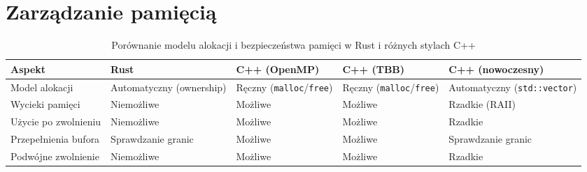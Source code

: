 \section{Zarządzanie pamięcią}
\begin{table}[H]
    \centering
    \caption{Porównanie modelu alokacji i bezpieczeństwa pamięci w Rust i różnych stylach C++}
    \begin{tabularx}{\textwidth}{lXXXX}
    \toprule
    \textbf{Aspekt} &
    \textbf{Rust} &
    \textbf{C++ (OpenMP)} &
    \textbf{C++ (TBB)} &
    \textbf{C++ (nowoczesny)} \\
    \midrule
    Model alokacji &
    Automatyczny (ownership) &
    Ręczny (\texttt{malloc}/\texttt{free}) &
    Ręczny (\texttt{malloc}/\texttt{free}) &
    Automatyczny (\texttt{std::vector}) \\
    
    Wycieki pamięci &
    Niemożliwe &
    Możliwe &
    Możliwe &
    Rzadkie (RAII) \\
    
    Użycie po zwolnieniu &
    Niemożliwe &
    Możliwe &
    Możliwe &
    Rzadkie \\
    
    Przepełnienia bufora &
    Sprawdzanie granic &
    Możliwe &
    Możliwe &
    Sprawdzanie granic \\
    
    Podwójne zwolnienie &
    Niemożliwe &
    Możliwe &
    Możliwe &
    Rzadkie \\
    \bottomrule
    \end{tabularx}
\end{table}

